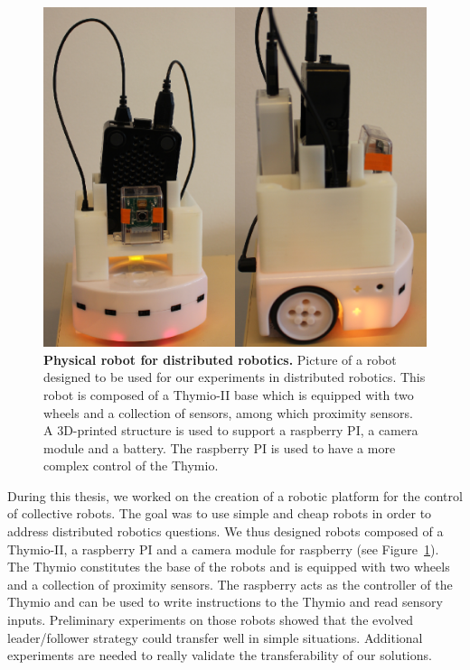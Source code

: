 	    \begin{figure}[hbt]
	        \begin{center}
	          \includegraphics[scale = 0.70]{fig/Discussion/Robot.png}
	          \caption{\textbf{Physical robot for distributed robotics.}
	          Picture of a robot designed to be used for our experiments in distributed robotics. This robot is composed of a Thymio-II base which is equipped with two wheels and a collection of sensors, among which proximity sensors. A 3D-printed structure is used to support a raspberry PI, a camera module and a battery. The raspberry PI is used to have a more complex control of the Thymio.} 
	          \label{fig:thymioPicture}
	        \end{center}
	    \end{figure}

			During this thesis, we worked on the creation of a robotic platform for the control of collective robots. The goal was to use simple and cheap robots in order to address distributed robotics questions. We thus designed robots composed of a Thymio-II, a raspberry PI and a camera module for raspberry (see Figure~\ref{fig:thymioPicture}). The Thymio constitutes the base of the robots and is equipped with two wheels and a collection of proximity sensors. The raspberry acts as the controller of the Thymio and can be used to write instructions to the Thymio and read sensory inputs. Preliminary experiments on those robots showed that the evolved leader/follower strategy could transfer well in simple situations. Additional experiments are needed to really validate the transferability of our solutions.

